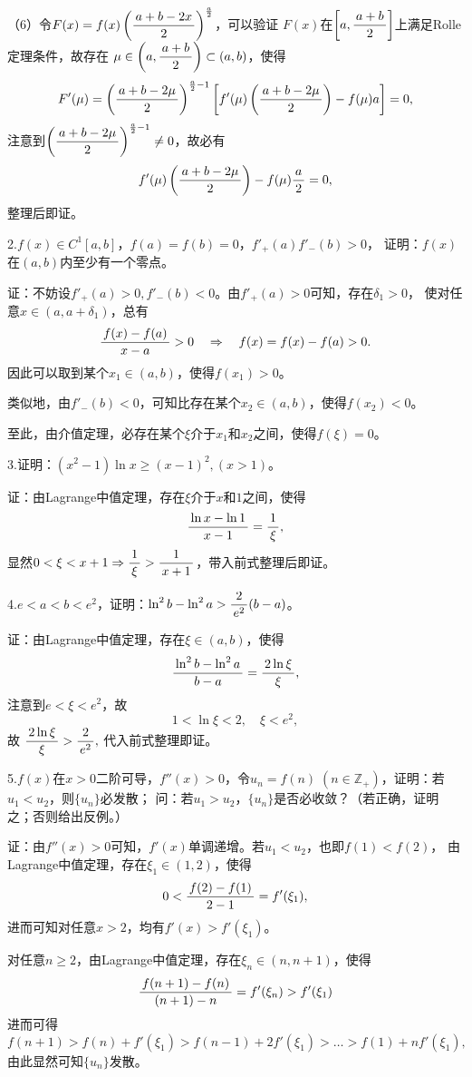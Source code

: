 （6）令$F(x)=f(x)\left(\displaystyle\frac{\,{a+b-2x}\,}{\,{2}\,}\right)^{\frac a2}$，可以验证
$F(x)$在$\left[a,\displaystyle\frac{\,{a+b}\,}{\,{2}\,}\right]$上满足Rolle定理条件，故存在
$\mu\in\left(a,\displaystyle\frac{\,{a+b}\,}{\,{2}\,}\right)\subset(a,b)$，使得
$$F'(\mu)=\left(\displaystyle\frac{\,{a+b-2\mu}\,}{\,{2}\,}\right)^{\frac a2-1}
\left[f'(\mu)\left(\displaystyle\frac{\,{a+b-2\mu}\,}{\,{2}\,}\right)
-f(\mu)a\right]=0,$$
注意到$\left(\displaystyle\frac{\,{a+b-2\mu}\,}{\,{2}\,}\right)^{\frac a2-1}\ne0$，故必有
$$f'(\mu)\left(\displaystyle\frac{\,{a+b-2\mu}\,}{\,{2}\,}\right)-f(\mu)\displaystyle\frac{\,{a}\,}{\,{2}\,}=0,$$
整理后即证。\fin

\bigskip

2.$f(x)\in C^1[a,b]$，$f(a)=f(b)=0$，$f'_+(a)f'_-(b)>0$，
证明：$f(x)$在$(a,b)$内至少有一个零点。

证：不妨设$f'_+(a)>0,f'_-(b)<0$。由$f'_+(a)>0$可知，存在$\delta_1>0$，
使对任意$x\in(a,a+\delta_1)$，总有
$$\displaystyle\frac{\,{f(x)-f(a)}\,}{\,{x-a}\,}>0\quad\Rightarrow
\quad f(x)=f(x)-f(a)>0.$$
因此可以取到某个$x_1\in(a,b)$，使得$f(x_1)>0$。

类似地，由$f'_-(b)<0$，可知比存在某个$x_2\in(a,b)$，使得$f(x_2)<0$。

至此，由介值定理，必存在某个$\xi$介于$x_1$和$x_2$之间，使得$f(\xi)=0$。
\fin

\bigskip

3.证明：$(x^2-1)\ln x\geq(x-1)^2,(x>1)$。

证：由Lagrange中值定理，存在$\xi$介于$x$和$1$之间，使得
$$\displaystyle\frac{\,{\ln x-\ln 1}\,}{\,{x-1}\,}=\displaystyle\frac{\,{1}\,}{\,{\xi}\,},$$
显然$0<\xi<x+1\Rightarrow\displaystyle\frac{\,{1}\,}{\,{\xi}\,}>\displaystyle\frac{\,{1}\,}{\,{x+1}\,}$，带入前式整理后即证。
\fin

\bigskip

4.$e<a<b<e^2$，证明：$\ln^2b-\ln^2a>\displaystyle\frac{\,{2}\,}{\,{e^2}\,}(b-a)$。

证：由Lagrange中值定理，存在$\xi\in(a,b)$，使得
$$\displaystyle\frac{\,{\ln^2b-\ln^2a}\,}{\,{b-a}\,}=\displaystyle\frac{\,{2\ln\xi}\,}{\,{\xi}\,},$$
注意到$e<\xi<e^2$，故
$$1<\ln\xi<2,\quad \xi<e^2,$$
故
$\displaystyle\frac{\,{2\ln\xi}\,}{\,{\xi}\,}>\displaystyle\frac{\,{2}\,}{\,{e^2}\,},$
代入前式整理即证。\fin

\bigskip

5.$f(x)$在$x>0$二阶可导，$f''(x)>0$，令$u_n=f(n)\;
 (n\in\mathbb{Z}_+)$，证明：若$u_1<u_2$，则$\{u_n\}$必发散；
问：若$u_1>u_2$，$\{u_n\}$是否必收敛？（若正确，证明之；否则给出反例。）

证：由$f''(x)>0$可知，$f'(x)$单调递增。若$u_1<u_2$，也即$f(1)<f(2)$，
由Lagrange中值定理，存在$\xi_1\in(1,2)$，使得
$$0<\displaystyle\frac{\,{f(2)-f(1)}\,}{\,{2-1}\,}=f'(\xi_1),$$
进而可知对任意$x>2$，均有$f'(x)>f'(\xi_1)$。

对任意$n\geq2$，由Lagrange中值定理，存在$\xi_n\in(n,n+1)$，使得
$$\displaystyle\frac{\,{f(n+1)-f(n)}\,}{\,{(n+1)-n}\,}=f'(\xi_n)>f'(\xi_1)$$
进而可得
$$
f(n+1)>f(n)+f'(\xi_1)>f(n-1)+2f'(\xi_1)>\ldots>f(1)+nf'(\xi_1),
$$
由此显然可知$\{u_n\}$发散。


